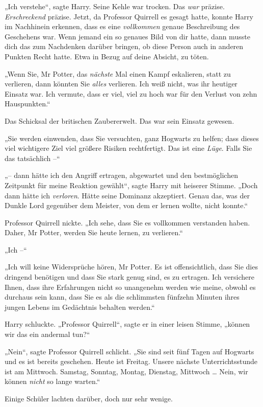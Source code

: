 {„Ich verstehe“, sagte Harry. Seine Kehle war trocken. Das \emph{war} präzise. \emph{Erschreckend} präzise. Jetzt, da Professor Quirrell es gesagt hatte, konnte Harry im Nachhinein erkennen, dass es eine \emph{vollkommen} genaue Beschreibung des Geschehens war. Wenn jemand ein so genaues Bild von dir hatte, dann musste dich das zum Nachdenken darüber bringen, ob diese Person auch in anderen Punkten Recht hatte. Etwa in Bezug auf deine Absicht, zu töten.

„Wenn Sie, Mr Potter, das \emph{nächste} Mal einen Kampf eskalieren, statt zu verlieren, dann könnten Sie \emph{alles} verlieren. Ich weiß nicht, was ihr heutiger Einsatz war. Ich vermute, dass er viel, viel zu hoch war für den Verlust von zehn Hauspunkten.“

Das Schicksal der britischen Zaubererwelt. Das war sein Einsatz gewesen.

„Sie werden einwenden, dass Sie versuchten, ganz Hogwarts zu helfen; dass dieses viel wichtigere Ziel viel größere Risiken rechtfertigt. Das ist eine \emph{Lüge}. Falls Sie das tatsächlich --“

„-- dann hätte ich den Angriff ertragen, abgewartet und den bestmöglichen Zeitpunkt für meine Reaktion gewählt“, sagte Harry mit heiserer Stimme. „Doch dann hätte ich \emph{verloren}. Hätte seine Dominanz akzeptiert. Genau das, was der Dunkle Lord gegenüber dem Meister, von dem er lernen wollte, nicht konnte.“

Professor Quirrell nickte. „Ich sehe, dass Sie es vollkommen verstanden haben. Daher, Mr Potter, werden Sie heute lernen, zu verlieren.“

„Ich --“

„Ich will keine Widersprüche hören, Mr Potter. Es ist offensichtlich, dass Sie dies dringend benötigen und dass Sie stark genug sind, es zu ertragen. Ich versichere Ihnen, dass ihre Erfahrungen nicht so unangenehm werden wie meine, obwohl es durchaus sein kann, dass Sie es als die schlimmsten fünfzehn Minuten ihres jungen Lebens im Gedächtnis behalten werden.“

Harry schluckte. „Professor Quirrell“, sagte er in einer leisen Stimme, „können wir das ein andermal tun?“

„Nein“, sagte Professor Quirrell schlicht. „Sie sind seit fünf Tagen auf Hogwarts und es ist bereits geschehen. Heute ist Freitag. Unsere nächste Unterrichtsstunde ist am Mittwoch. Samstag, Sonntag, Montag, Dienstag, Mittwoch … Nein, wir können \emph{nicht} so lange warten.“

Einige Schüler lachten darüber, doch nur sehr wenige.

}
